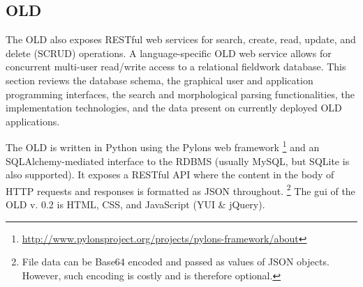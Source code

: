 \documentclass[11pt]{article}
\begin{document}
\subsection{OLD}\label{sec:old}

The OLD also exposes RESTful web services for search, create, read, update, and delete
(SCRUD) operations. A language-specific OLD web service allows for concurrent
multi-user read/write access to a relational fieldwork database. This section
 reviews the database schema, the graphical user and
application programming interfaces, the search and morphological parsing
functionalities, the implementation technologies, and the data present on
currently deployed OLD applications.



The OLD is written in Python using the Pylons web framework%
\footnote{\url{http://www.pylonsproject.org/projects/pylons-framework/about}} %
and an SQLAlchemy-mediated interface to the RDBMS (usually MySQL, but SQLite is also
supported). It exposes a RESTful API where the content in the body of HTTP 
requests and responses is formatted as JSON throughout.%
\footnote{File data can be Base64 encoded and passed as values of JSON objects.
However, such encoding is costly and is therefore optional.} %
The \gls{gui} of the OLD v. 0.2 is HTML, CSS, and JavaScript (YUI \& jQuery).
\end{document}
